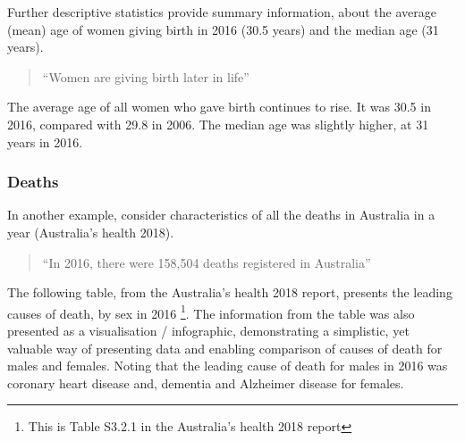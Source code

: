 \documentclass[
]{memoir}
\begin{document}
Further descriptive statistics provide summary information, about the average (mean) age of women giving birth in 2016 (30.5 years) and the median age (31 years).

\begin{quote}
``Women are giving birth later in life''
\end{quote}

The average age of all women who gave birth continues to rise. It was 30.5 in 2016, compared with 29.8 in 2006. The median age was slightly higher, at 31 years in 2016.

\hypertarget{deaths}{%
\subsubsection{Deaths}\label{deaths}}

In another example, consider characteristics of all the deaths in Australia in a year (Australia's health 2018).

\begin{quote}
``In 2016, there were 158,504 deaths registered in Australia''
\end{quote}

The following table, from the Australia's health 2018 report, presents the leading causes of death, by sex in 2016 \footnote{This is Table S3.2.1 in the Australia's health 2018 report}. The information from the table was also presented as a visualisation / infographic, demonstrating a simplistic, yet valuable way of presenting data and enabling comparison of causes of death for males and females. Noting that the leading cause of death for males in 2016 was coronary heart disease and, dementia and Alzheimer disease for females.

 
  \providecommand{\huxb}[2]{\arrayrulecolor[RGB]{#1}\global\arrayrulewidth=#2pt}
  \providecommand{\huxvb}[2]{\color[RGB]{#1}\vrule width #2pt}
  \providecommand{\huxtpad}[1]{\rule{0pt}{#1}}
  \providecommand{\huxbpad}[1]{\rule[-#1]{0pt}{#1}}
\end{document}
